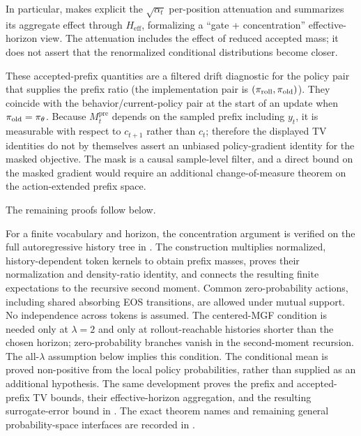 \noindent In particular,  makes explicit the $\sqrt{\alpha_t}$ per-position attenuation and summarizes its
aggregate effect through $H_{\mathrm{eff}}$, formalizing a ``gate + concentration'' effective-horizon view.
The attenuation includes the effect of reduced accepted mass; it does not
assert that the renormalized conditional distributions become closer.

These accepted-prefix quantities are a filtered drift diagnostic for the
policy pair that supplies the prefix ratio (the implementation pair is
$(\pi_{\mathrm{roll}},\pi_{\mathrm{old}})$). They coincide with the behavior/current-policy pair at
the start of an update when $\pi_{\mathrm{old}}=\pi_{\theta}$. Because
$M_t^{\mathrm{pre}}$ depends on the sampled prefix including $y_t$, it is measurable with respect to $c_{t+1}$ rather than $c_t$;
therefore the displayed TV identities do not by themselves assert an unbiased policy-gradient identity for the masked objective. The
mask is a causal sample-level filter, and a direct bound on the masked gradient would require an additional change-of-measure theorem on
the action-extended prefix space.

The remaining proofs follow below.

For a finite vocabulary and horizon, the concentration argument is verified
on the full autoregressive history tree in .
The construction multiplies normalized, history-dependent token kernels to
obtain prefix masses, proves their normalization and density-ratio identity,
and connects the resulting finite expectations to the recursive second moment.
Common zero-probability actions, including shared absorbing EOS transitions,
are allowed under mutual support. No independence across tokens is assumed.
The centered-MGF condition is needed only at $\lambda=2$ and only at rollout-reachable histories
shorter than the chosen horizon; zero-probability branches vanish in the second-moment recursion.
The all-$\lambda$ assumption below implies
this condition. The conditional mean is proved non-positive from the local
policy probabilities, rather than supplied as an additional hypothesis.
The same development proves the prefix and accepted-prefix TV bounds, their
effective-horizon aggregation, and the resulting surrogate-error bound in
.
The exact theorem names and remaining general probability-space interfaces
are recorded in .


